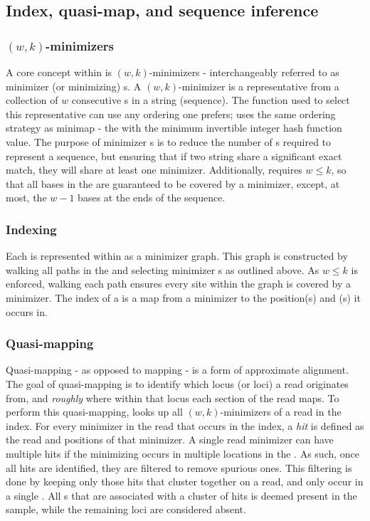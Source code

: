 \subsection{Index, quasi-map, and sequence inference}

\subsubsection{$(w,k)$-minimizers}
A core concept within \pandora{} is $(w,k)$-minimizers \cite{Roberts2004} - interchangeably referred to as minimizer (or minimizing) \kmer{}s. A $(w,k)$-minimizer is a representative \kmer{} from a collection of $w$ consecutive \kmer{}s in a string (sequence). The function used to select this representative can use any ordering one prefers; \pandora{} uses the same ordering strategy as minimap \cite{minimap2016} - the \kmer{} with the minimum invertible integer hash function value. The purpose of minimizer \kmer{}s is to reduce the number of \kmer{}s required to represent a sequence, but ensuring that if two string share a significant exact match, they will share at least one minimizer. Additionally, \pandora{} requires $w\le k$, so that all bases in the \prg{} are guaranteed to be covered by a minimizer, except, at most, the $w-1$ bases at the ends of the sequence.

\subsubsection{Indexing}
Each \prg{} is represented within \pandora{} as a minimizer \kmer{} graph. This graph is constructed by walking all paths in the \prg{} and selecting minimizer \kmer{}s as outlined above. As $w\le k$ is enforced, walking each path ensures every site within the graph is covered by a minimizer. The index of a \panrg{} is a map from a minimizer \kmer{} to the position(s) and \prg{}(s) it occurs in. 

\subsubsection{Quasi-mapping}
\label{sec:quasi-map}
Quasi-mapping - as opposed to mapping - is a form of approximate alignment. The goal of quasi-mapping is to identify which locus (or loci) a read originates from, and \emph{roughly} where within that locus each section of the read maps. To perform this quasi-mapping, \pandora{} looks up all $(w,k)$-minimizers of a read in the index. For every minimizer in the read that occurs in the index, a \emph{hit} is defined as the read and \prg{} positions of that minimizer. A single read minimizer can have multiple hits if the minimizing \kmer{} occurs in multiple locations in the \panrg{}. As such, once all hits are identified, they are filtered to remove spurious ones. This filtering is done by keeping only those hits that cluster together on a read, and only occur in a single \prg{}. All \prg{}s that are associated with a cluster of hits is deemed present in the sample, while the remaining loci are considered absent.

